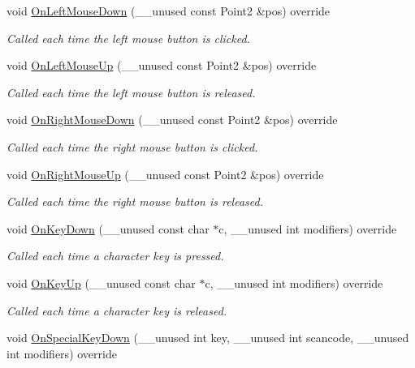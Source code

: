 \begin{DoxyCompactItemize}
void \hyperlink{classRobotViewer_a51776dc0f3c06be3e459e2669a7bd3ff}{On\+Left\+Mouse\+Down} (\+\_\+\+\_\+unused const Point2 \&pos) override
\begin{DoxyCompactList}\small\item\em Called each time the left mouse button is clicked. \end{DoxyCompactList}\item 
void \hyperlink{classRobotViewer_a4b9372334e89152c2f8daf2cc2687943}{On\+Left\+Mouse\+Up} (\+\_\+\+\_\+unused const Point2 \&pos) override
\begin{DoxyCompactList}\small\item\em Called each time the left mouse button is released. \end{DoxyCompactList}\item 
void \hyperlink{classRobotViewer_ab5420b89be50106eefcbc44dece71e74}{On\+Right\+Mouse\+Down} (\+\_\+\+\_\+unused const Point2 \&pos) override
\begin{DoxyCompactList}\small\item\em Called each time the right mouse button is clicked. \end{DoxyCompactList}\item 
void \hyperlink{classRobotViewer_afe613a2bd8c13810327cf5344dac1a5e}{On\+Right\+Mouse\+Up} (\+\_\+\+\_\+unused const Point2 \&pos) override
\begin{DoxyCompactList}\small\item\em Called each time the right mouse button is released. \end{DoxyCompactList}\item 
void \hyperlink{classRobotViewer_a5a5e4be05ae7a8b3d137a3388638ad63}{On\+Key\+Down} (\+\_\+\+\_\+unused const char $\ast$c, \+\_\+\+\_\+unused int modifiers) override
\begin{DoxyCompactList}\small\item\em Called each time a character key is pressed. \end{DoxyCompactList}\item 
void \hyperlink{classRobotViewer_a7607dc80b550f1e1f2d88cccb21fe6af}{On\+Key\+Up} (\+\_\+\+\_\+unused const char $\ast$c, \+\_\+\+\_\+unused int modifiers) override
\begin{DoxyCompactList}\small\item\em Called each time a character key is released. \end{DoxyCompactList}\item 
void \hyperlink{classRobotViewer_a76911b260748dc4b4d5187fd85e23b71}{On\+Special\+Key\+Down} (\+\_\+\+\_\+unused int key, \+\_\+\+\_\+unused int scancode, \+\_\+\+\_\+unused int modifiers) override

\end{DoxyCompactItemize}
